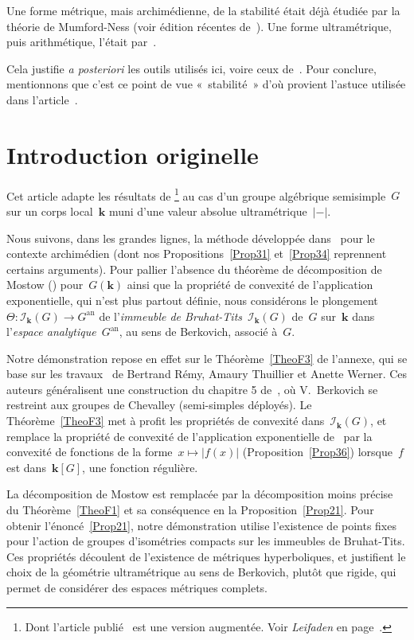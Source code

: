 \documentclass[french]{amsart}
\newcommand{\kk}{\mathbf{k}}
\newcommand{\abs}[1]{{\left|{#1}\right|}}
\newcommand{\Ik}{\mathscr{I}_\kk}
\newcommand{\an}{\textrm{an}}
\begin{document}
Une forme métrique, mais archimédienne, de la stabilité était déjà étudiée par la théorie de Mumford-Ness (voir édition récentes de~\cite{GIT}). Une forme ultramétrique, puis arithmétique, l'était par~\cite{Burnol}.

Cela justifie \emph{a posteriori} les outils utilisés ici, voire ceux de~\cite{RS09}. Pour conclure, mentionnons que c'est ce point de vue «~stabilité~» d'où provient l'astuce utilisée dans l’article~\cite{RichardShah}.

\section*{Introduction originelle}
Cet article adapte les résultats de \cite{RS09}\footnote{Dont l'article publié~\cite{RichardShah} est une version augmentée. Voir \emph{Leifaden} en page~\pageref{Leitfaden}.} au cas d'un groupe algébrique semi\-sim\-ple~$G$ sur un corps local~$\kk$ muni d'une valeur absolue ultramétrique~$\abs{-}$.

Nous suivons, dans les grandes lignes, la méthode développée dans~\cite{RS09} pour le contexte archimédien (dont nos Propositions~\ref{Prop31} et~\ref{Prop34} reprennent certains arguments). Pour pallier l'absence du théorème de décomposition de Mostow (\cite{Mos55}) pour~$G(\kk)$ ainsi que la propriété de convexité de l'application exponentielle, qui n'est plus partout définie, nous considérons le plongement~$\Theta:\Ik(G)\to G^\an$ de l'\emph{immeuble de Bruhat-Tits}~$\Ik(G)$ de~$G$ sur~$\kk$ dans l'\emph{espace analytique}~$G^\an$, au sens de Berkovich, associé à~$G$.

Notre démonstration repose en effet sur le Théorème~\ref{TheoF3} de l'annexe, qui se base sur les travaux~\cite{RTW09} de Bertrand Rémy, Amaury Thuillier et Anette Werner. Ces auteurs généralisent une construction du chapitre 5 de~\cite{Ber90}, où V.~Berkovich se restreint aux groupes de Chevalley (semi-simples déployés). Le Théorème~\ref{TheoF3} met à profit les propriétés de convexité dans~$\Ik(G)$, et remplace la propriété de convexité de l'application exponentielle de~\cite{RS09} par la convexité de fonctions de la forme~$x\mapsto \abs{f(x)}$ (Proposition~\ref{Prop36}) lorsque~$f$ est dans~$\kk[G]$, une fonction régulière.

La décomposition de Mostow est remplacée par la décomposition moins
précise du Théorème~\ref{TheoF1} et sa conséquence en la Proposition~\ref{Prop21}. Pour obtenir l'énoncé~\ref{Prop21}, notre démonstration utilise l'existence de points fixes pour l'action
de groupes d'isométries compacts sur les immeubles de Bruhat-Tits. Ces propriétés
découlent de l'existence de métriques hyperboliques, et justifient le choix
de la géométrie ultramétrique au sens de Berkovich, plutôt que rigide, qui permet de considérer des
espaces métriques complets.
\end{document}
